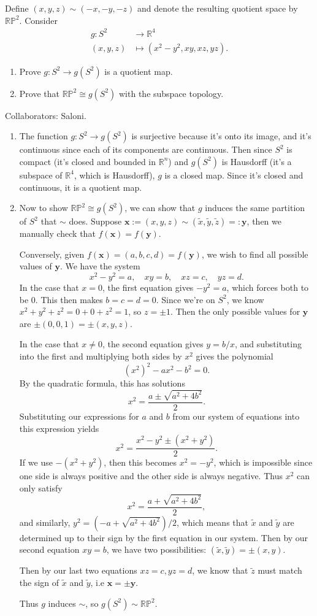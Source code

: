 \documentclass[10pt]{report}
\begin{document}
\pagebreak
\begin{exer}[]
	Define $(x,y,z) \sim (-x,-y,-z)$ and denote the resulting quotient space by $\mathbb{R}\mathbb{P}^2$. Consider
	\begin{align*}
		g:S^2&\to \mathbb{R}^4 \\
		(x,y,z)&\mapsto (x^2-y^2,xy,xz,yz).
	\end{align*}
	\begin{enumerate}
		\item Prove $g:S^2\to g(S^2)$ is a quotient map.
		\item Prove that $\mathbb{R}\mathbb{P}^2 \cong g(S^2)$ with the subspace topology.
	\end{enumerate}
\end{exer}
{\color{blue}Collaborators: Saloni.}
\begin{enumerate}
	\item The function $g:S^2\to g(S^2)$ is surjective because it's onto its image, and it's continuous since each of its components are continuous. Then since $S^2$ is compact (it's closed and bounded in $\mathbb{R}^n$) and $g(S^2)$ is Hausdorff (it's a subspace of $\mathbb{R}^4$, which is Hausdorff), $g$ is a closed map. Since it's closed and continuous, it is a quotient map.
	\item Now to show $\mathbb{R}\mathbb{P}^2 \cong g(S^2)$, we can show that $g$ induces the same partition of $S^2$ that $\sim$ does. Suppose $\mathbf{x} := (x,y,z) \sim (\tilde{x},\tilde{y},\tilde{z}) =: \mathbf{y}$, then we manually check that $f(\mathbf{x})=f(\mathbf{y})$.

		Conversely, given $f(\mathbf{x}) = (a,b,c,d) = f(\mathbf{y})$, we wish to find all possible values of $\mathbf{y}$. We have the system
		\[
		x^2-y^2=a, \quad xy=b, \quad xz=c, \quad yz=d.
		\] 
		In the case that $x=0$, the first equation gives $-y^2=a$, which forces both to be 0. This then makes $b=c=d=0$. Since we're on $S^2$, we know $x^2+y^2+z^2=0+0+z^2=1$, so $z = \pm 1$. Then the only possible values for $\mathbf{y}$ are $\pm(0,0,1) = \pm (x,y,z)$.

		In the case that $x \neq 0$, the second equation gives $y=b/x$, and substituting into the first and multiplying both sides by $x^2$ gives the polynomial
		\[
			(x^2)^2 - ax^2-b^2=0.
		\] By the quadratic formula, this has solutions
		\[
			x^2 = \frac{a \pm \sqrt{a^2 +4b^2}}{2} .
	\] Substituting our expressions for $a$ and $b$ from our system of equations into this expression yields
	\[
		x^2 = \frac{x^2-y^2 \pm (x^2+y^2)}{2} .
	\] If we use $-(x^2+y^2)$, then this becomes $x^2=-y^2$, which is impossible since one side is always positive and the other side is always negative. Thus $x^2$ can only satisfy
	\[
	x^2 = \frac{a + \sqrt{a^2+4b^2} }{2},
\] and similarly, $y^2 = (-a + \sqrt{a^2+4b^2} )/2$, which means that $\tilde{x}$ and $\tilde{y}$ are determined up to their sign by the first equation in our system. Then by our second equation $xy=b$, we have two possibilities: $(\tilde{x},\tilde{y}) = \pm (x,y)$.

Then by our last two equations $xz=c, yz=d$, we know that $\tilde{z}$ must match the sign of $\tilde{x}$ and $\tilde{y}$, i.e $\mathbf{x} =\pm\mathbf{y}$.

Thus $g$ induces $\sim$, so $g(S^2) \sim \mathbb{R}\mathbb{P}^2$.
\end{enumerate}
\end{document}
